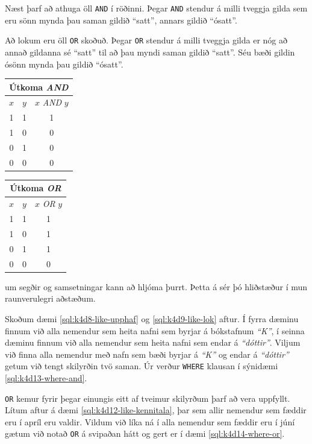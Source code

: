 Næst þarf að athuga öll \verb|AND| í röðinni. Þegar \verb|AND| stendur á milli tveggja gilda sem eru sönn mynda þau saman gildið ``satt'', annars gildið ``ósatt''.

Að lokum eru öll \verb|OR| skoðuð. Þegar \verb|OR| stendur á milli tveggja gilda er nóg að annað gildanna sé ``satt'' til að þau myndi saman gildið ``satt''. Séu bæði gildin ósönn mynda þau gildið ``ósatt''.

\begin{table}
\centering
\begin{tabular}{ccc}
\multicolumn{3}{c}{Útkoma \emph{AND}}\\
\toprule
$x$&$y$&$x$ \emph{AND} $y$\\
\midrule
1&1&1\\
1&0&0\\
0&1&0\\
0&0&0\\
\bottomrule
\end{tabular}
\hspace{1cm}
\begin{tabular}{ccc}
\multicolumn{3}{c}{Útkoma \emph{OR}}\\
\toprule
$x$&$y$&$x$ \emph{OR} $y$\\
\midrule
1&1&1\\
1&0&1\\
0&1&1\\
0&0&0\\
\bottomrule
\end{tabular}
\end{table}

 um segðir og samsetningar kann að hljóma þurrt. Þetta á sér þó hliðstæður í mun raunverulegri aðstæðum.

Skoðum dæmi \ref{sql:k4d8-like-upphaf} og \ref{sql:k4d9-like-lok} aftur. Í fyrra dæminu finnum við alla nemendur sem heita nafni sem byrjar á bókstafnum \emph{``K''}, í seinna dæminu finnum við alla nemendur sem heita nafni sem endar á \emph{``dóttir''}. Viljum við finna alla nemendur með nafn sem bæði byrjar á \emph{``K''} og endar á \emph{``dóttir''} getum við tengt skilyrðin tvö saman. Úr verður \verb|WHERE| klausan í sýnidæmi \ref{sql:k4d13-where-and}.

\verb|OR| kemur fyrir þegar einungis eitt af tveimur skilyrðum þarf að vera uppfyllt. Lítum aftur á dæmi \ref{sql:k4d12-like-kennitala}, þar sem allir nemendur sem fæddir eru í apríl eru valdir. Vildum við líka ná í alla nemendur sem fæddir eru í júní gætum við notað \verb|OR| á svipaðan hátt og gert er í dæmi \ref{sql:k4d14-where-or}.

